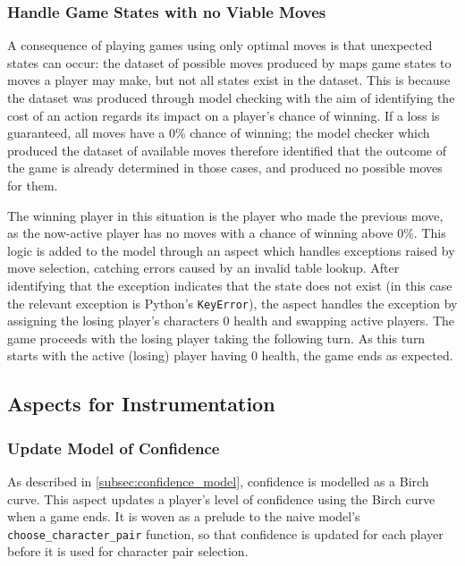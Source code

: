 \subsubsection{Handle Game States with no Viable Moves}

A consequence of playing games using only optimal moves is that unexpected
states can occur: the dataset of possible moves produced by
\citet{kavanagh2021thesis} maps game states to moves a player may make, but not
all states exist in the dataset. This is because the dataset was produced
through model checking with the aim of identifying the cost of an action regards
its impact on a player's chance of winning. If a loss is guaranteed, all moves
have a 0\% chance of winning; the model checker which produced the dataset of
available moves therefore identified that the outcome of the game is already
determined in those cases, and produced no possible moves for them. 

The winning player in this situation is the player who made the previous move,
as the now-active player has no moves with a chance of winning above 0\%. This
logic is added to the model through an aspect which handles exceptions raised by
move selection, catching errors caused by an invalid table lookup. After
identifying that the exception indicates that the state does not exist (in this
case the relevant exception is Python's \lstinline{KeyError}), the aspect
handles the exception by assigning the losing player's characters 0 health and
swapping active players. The game proceeds with the losing player taking the
following turn. As this turn starts with the active (losing) player having 0
health, the game ends as expected.


\subsection{Aspects for Instrumentation}\label{subsec:aspects_instrumenting_model}

\subsubsection{Update Model of Confidence}
\label{confidence_model_aspect_impl_writeup}

As described in \cref{subsec:confidence_model}, confidence is modelled as a
Birch curve. This aspect updates a player's level of confidence using the Birch
curve when a game ends. It is woven as a prelude to the naive model's
\lstinline{choose_character_pair} function, so that confidence is updated for
each player before it is used for character pair selection.


